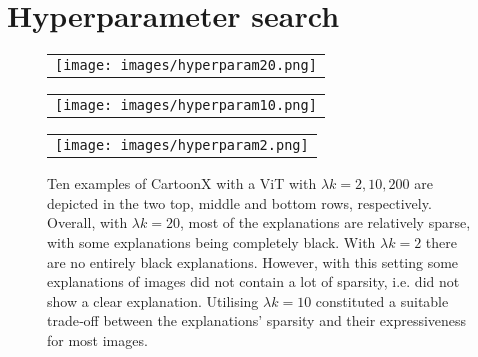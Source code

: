 \newpage
\appendix
\section{Hyperparameter search}\label{ap:hyperparam}
\begin{figure}[!h]
    \centering
    \begin{tabular}{@{}c@{}}
        \texttt{[image: images/hyperparam20.png]}
    \end{tabular}
    \begin{tabular}{@{}c@{}}
        \texttt{[image: images/hyperparam10.png]}
    \end{tabular}
    \begin{tabular}{@{}c@{}}
        \texttt{[image: images/hyperparam2.png]}
    \end{tabular}
    \caption{Ten examples of CartoonX with a ViT with $\lambda k = 2, 10, 200$ are depicted in the two top, middle and bottom rows, respectively. Overall, with $\lambda k = 20$, most of the explanations are relatively sparse, with some explanations being completely black. With $\lambda k = 2$ there are no entirely black explanations. However, with this setting some explanations of images did not contain a lot of sparsity, i.e. did not show a clear explanation. Utilising  $\lambda k = 10$ constituted a suitable trade‐off between the explanations' sparsity and their expressiveness for most images.}
    \label{fig:hyperparamsVit}
\end{figure}
